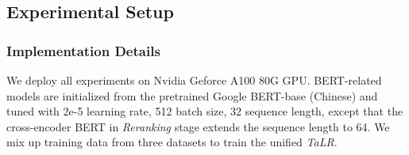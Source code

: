 \subsection{Experimental Setup}
\subsubsection{Implementation Details}
\label{sec:exp detail}
We deploy all experiments on Nvidia Geforce A100 80G GPU.
BERT-related models are initialized from the pretrained Google BERT-base (Chinese) and tuned with 2e-5 learning rate, 512 batch size, 32 sequence length, except that the cross-encoder BERT in \textit{Reranking} stage extends the sequence length to 64. 
We mix up training data from three datasets to train the unified \textit{TaLR}. 




